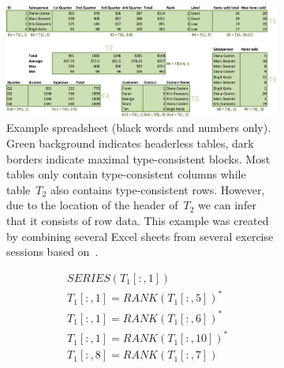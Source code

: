 \documentclass{IEEEtran}
\newcommand{\range}[3]{\ensuremath{#1[#2,#3]}}
\newcommand{\rangeall}{:}
\newcommand{\eccalc}[2]{\ensuremath{#1 = #2}}
\newcommand{\ecrank}[2]{\eccalc{#1}{\textit{RANK}(#2)}}
\newcommand{\ecperm}[1]{\ensuremath{\textit{PERMUTATION}(#1)}}
\newcommand{\ecseries}[1]{\ensuremath{\textit{SERIES}(#1)}}
\theoremstyle{definition}
\begin{document}
\begin{figure}[thb]

  \begin{subfigure}{.66\textwidth}
  \begin{center}
    \includegraphics[width=1\textwidth]{figures/Demo2.png}
  \end{center}
  \vspace{-10pt}
  \caption{
    Example spreadsheet (black words and numbers only).
    Green background indicates headerless tables, dark borders indicate maximal type-consistent blocks.
    Most tables only contain type-consistent columns while table~$T_2$ also contains type-consistent rows.
    However, due to the location of the header of~$T_2$ we can infer that it consists of row data.
    This example was created by combining several Excel sheets from several exercise sessions based on~\cite{excel_book}.
  }
  \label{fig:main_example}
\end{subfigure}
\hfill
\begin{subfigure}{.34\textwidth}
  {\footnotesize
    \begin{align*}
      &~\ecseries{\range{T_{1}}{\rangeall}{1}} \\
%
%
      &~\ecrank{\range{T_{1}}{\rangeall}{1}}{\range{T_{1}}{\rangeall}{5}}^*\\
      &~\ecrank{\range{T_{1}}{\rangeall}{1}}{\range{T_{1}}{\rangeall}{6}}^* \\
      &~\ecrank{\range{T_{1}}{\rangeall}{1}}{\range{T_{1}}{\rangeall}{10}}^*\\
      &~\ecrank{\range{T_{1}}{\rangeall}{8}}{\range{T_{1}}{\rangeall}{7}} \\

\end{align*}}
\end{subfigure}
\end{figure}
\end{document}
